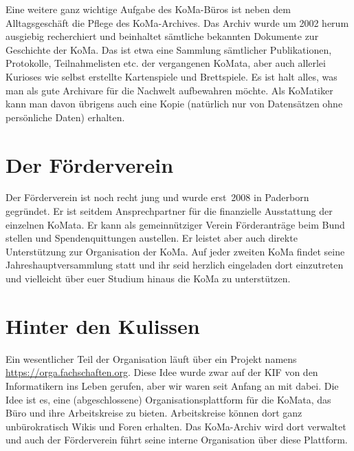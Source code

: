 Eine weitere ganz wichtige Aufgabe des KoMa-Büros ist neben dem Alltagsgeschäft
die Pflege des KoMa-Archives. Das Archiv wurde um 2002 herum ausgiebig
recherchiert und beinhaltet sämtliche bekannten Dokumente zur Geschichte der
KoMa. Das ist etwa eine Sammlung sämtlicher Publikationen, Protokolle,
Teilnahmelisten etc. der vergangenen KoMata, aber auch allerlei Kurioses wie
selbst erstellte Kartenspiele und Brettspiele. Es ist halt alles, was man als
gute Archivare für die Nachwelt aufbewahren möchte. Als KoMatiker kann man
davon übrigens auch eine Kopie (natürlich nur von Datensätzen ohne persönliche
Daten) erhalten.

\section{Der Förderverein}
Der Förderverein ist noch recht jung und wurde erst~2008 in %
Paderborn gegründet. Er ist seitdem Ansprechpartner für die finanzielle
Ausstattung der einzelnen KoMata. Er kann als gemeinnütziger Verein
Förderanträge beim Bund stellen und Spendenquittungen austellen. Er leistet
aber auch direkte Unterstützung zur Organisation der KoMa. Auf jeder zweiten
KoMa findet seine Jahreshauptversammlung statt und ihr seid herzlich eingeladen
dort einzutreten und vielleicht über euer Studium hinaus die KoMa zu
unterstützen.

\section{Hinter den Kulissen}
Ein wesentlicher Teil der Organisation läuft über ein Projekt namens
\url{https://orga.fachschaften.org}. Diese Idee wurde zwar auf der KIF von den
Informatikern ins Leben gerufen, aber wir waren seit Anfang an mit dabei. Die
Idee ist es, eine (abgeschlossene) Organisationsplattform für die KoMata, das
Büro und ihre Arbeitskreise zu bieten. Arbeitskreise können dort ganz
unbürokratisch Wikis und Foren erhalten. Das KoMa-Archiv wird dort verwaltet
und auch der Förderverein führt seine interne Organisation über diese
Plattform.
